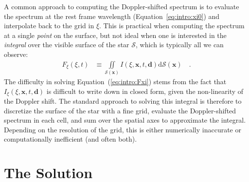 \documentclass[modern]{aastex62}
\begin{document}
A common approach to computing the Doppler-shifted spectrum is to
evaluate the spectrum at the rest frame wavelength 
(Equation~\ref{eq:intro:xi0})
and interpolate back to the grid in $\xi$. This is practical when
computing the spectrum at a single \emph{point} on the surface, but not
ideal when one is interested in the \emph{integral} over the visible
surface of the star $\mathcal{S}$, which is typically all we can observe:
%
\begin{align}
    \label{eq:intro:Fxi}
    F_\xi(\xi, t) 
        &\equiv
        \iint\limits_{\mathcal{S}(\mathbf{x})}
                I(\xi, \mathbf{x}, t, \mathbf{d})
        \mathrm{d}{\mathcal{S}(\mathbf{x})}
        \quad .
\end{align}
%
The difficulty in solving Equation~(\ref{eq:intro:Fxi}) stems from the fact
that $I_\xi(\xi, \mathbf{x}, t, \mathbf{d})$ is difficult to write down in closed form, given
the non-linearity of the Doppler shift.
The standard approach to solving this integral is therefore
to discretize the surface of the star with a fine grid, evaluate the
Doppler-shifted spectrum in each cell, and sum over the spatial axes
to approximate the integral. Depending on the resolution of the grid,
this is either numerically inaccurate or computationally inefficient 
(and often both).


\section{The Solution}
\end{document}
